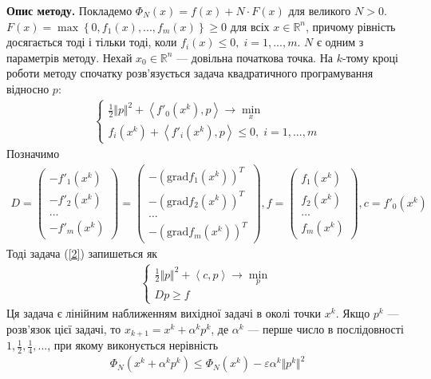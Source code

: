 \documentclass{extreport}
\begin{document}
\noindent\textbf{Опис методу.}
Покладемо $\Phi_N (x) = f(x) + N\cdot F(x)$ для великого $N>0$. $F(x) = \max\left\{0, f_1(x), ..., f_m(x)\right\} \geq 0$
для всіх $x \in \mathbb{R}^n$, причому рівність досягається тоді і тільки тоді, коли $f_i(x) \leq 0, \; i = 1,...,m$.
$N$ є одним з параметрів методу. Нехай $x_0 \in \mathbb{R}^n$ --- довільна початкова точка. На $k$-тому кроці роботи методу спочатку розв'язується
задача квадратичного програмування відносно $p$:
\begin{gather}\label{2}
    \begin{cases}
        \frac{1}{2} \Vert p \Vert^2 + \left<f'_0(x^k), p\right> \to \underset{x}{\min} \\
        f_i(x^k) + \left<f'_i(x^k), p\right> \leq 0, \; i = 1, ..., m
    \end{cases}
\end{gather}
Позначимо
\begin{gather*}
    D = \begin{pmatrix}
        -f'_1 (x^k) \\
        -f'_2 (x^k) \\
        \dots \\
        -f'_m(x^k)
    \end{pmatrix} = 
    \begin{pmatrix}
        -(\mathrm{grad}f_1 (x^k))^T \\
        -(\mathrm{grad}f_2 (x^k))^T \\
        \dots \\
        -(\mathrm{grad}f_m (x^k))^T
    \end{pmatrix},
    f = \begin{pmatrix}
        f_1(x^k) \\
        f_2(x^k) \\
        \dots \\
        f_m(x^k)
    \end{pmatrix},
    c = f'_0(x^k)
\end{gather*}
Тоді задача (\ref{2}) запишеться як
\begin{gather}\label{3}
    \begin{cases}
        \frac{1}{2} \Vert p \Vert^2 + \left<c, p\right> \to \underset{p}{\min} \\
        D p \geq f
    \end{cases}
\end{gather}
Ця задача є лінійним наближенням вихідної задачі в околі точки $x^k$.
Якщо $p^k$ --- розв'язок цієї задачі, то $x_{k+1} = x^k + \alpha^k p^k$, де $\alpha^k$ --- перше число в послідовності $1, \frac{1}{2}, \frac{1}{4}, ...$,
при якому виконується нерівність
\begin{gather}
    \Phi_N (x^k + \alpha^k p^k) \leq \Phi_N(x^k) - \varepsilon \alpha^k \Vert p^k \Vert^2
\end{gather}
\end{document}
